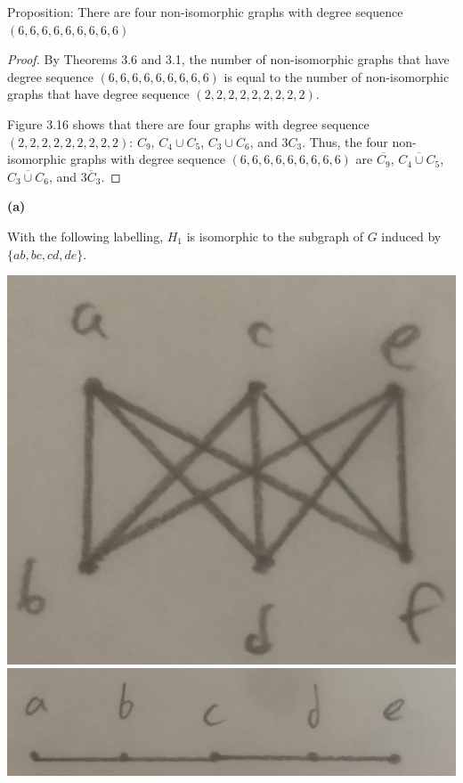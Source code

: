 \documentclass[12pt]{article}
\begin{document}
\newpage{} Proposition: There are four non-isomorphic graphs with degree sequence $(6,6,6,6,6,6,6,6,6)$
\begin{proof}
    By Theorems 3.6 and 3.1, the number of non-isomorphic graphs that have degree sequence $(6,6,6,6,6,6,6,6,6)$ is equal to the number of non-isomorphic graphs that have degree sequence $(2,2,2,2,2,2,2,2,2)$.

    Figure 3.16 shows that there are four graphs with degree sequence $(2,2,2,2,2,2,2,2,2)$: $C_9$, $C_4 \cup C_5$, $C_3 \cup C_6$, and $3C_3$.
    Thus, the four non-isomorphic graphs with degree sequence $(6,6,6,6,6,6,6,6,6)$ are $\overline{C_9}$, $\overline{C_4 \cup C_5}$, $\overline{C_3 \cup C_6}$, and $\overline{3C_3}$.
\end{proof}

\newpage{}

{\bf (a)}

With the following labelling, $H_1$ is isomorphic to the subgraph of $G$ induced by $\{ab, bc, cd, de\}$.
\begin{center}
\includegraphics[scale=.05]{317G.jpg}
\includegraphics[scale=.05]{317H1.jpg}
\end{center}
\end{document}
